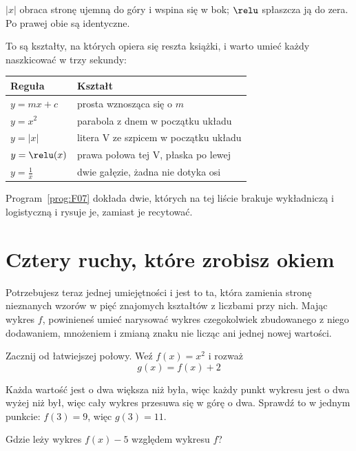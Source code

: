\begin{fr}
$\lvert x \rvert$ obraca stronę ujemną do góry i wspina się w bok; $\relu$
spłaszcza ją do zera. Po prawej obie są identyczne.

To są kształty, na których opiera się reszta książki, i warto umieć każdy
naszkicować w trzy sekundy:

\begin{center}
\begin{tabular}{ll}
\toprule
Reguła & Kształt \\
\midrule
$y = mx + c$ & prosta wznosząca się o $m$ \\
$y = x^{2}$ & parabola z dnem w początku układu \\
$y = \lvert x \rvert$ & litera V ze szpicem w początku układu \\
$y = \relu(x)$ & prawa połowa tej V, płaska po lewej \\
$y = \frac{1}{x}$ & dwie gałęzie, żadna nie dotyka osi \\
\bottomrule
\end{tabular}
\end{center}

Program~\ref{prog:F07} dokłada dwie, których na tej liście brakuje \dash{}
wykładniczą i logistyczną \dash{} i rysuje je, zamiast je recytować.
\end{fr}

\section{Cztery ruchy, które zrobisz okiem}
\label{sec:F05-moves}

\begin{fr}
Potrzebujesz teraz jednej umiejętności i jest to ta, która zamienia stronę
nieznanych wzorów w pięć znajomych kształtów z liczbami przy nich. Mając
wykres $f$, powinieneś umieć narysować wykres czegokolwiek zbudowanego z niego
dodawaniem, mnożeniem i zmianą znaku \dash{} nie licząc ani jednej nowej
wartości.

Zacznij od łatwiejszej połowy. Weź $f(x) = x^{2}$ i rozważ
\[ g(x) = f(x) + 2 \]

Każda wartość jest o dwa większa niż była, więc każdy punkt wykresu jest o dwa
wyżej niż był, więc cały wykres przesuwa się w górę o dwa. Sprawdź to w jednym
punkcie: $f(3) = 9$, więc $g(3) = 11$.

Gdzie leży wykres $f(x) - 5$ względem wykresu $f$?
\nextframe
\end{fr}


